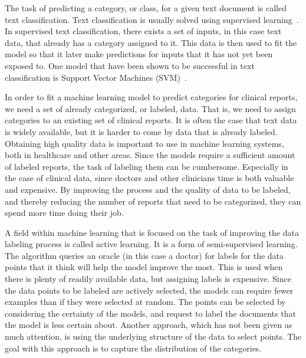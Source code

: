 The task of predicting a category, or class, for a given text document is called text classification.
Text classification is usually solved using supervised learning~\cite{aggarwal2012surveyclass}. 
In supervised text classification, there exists a set of inputs, in this case text data, that already has a category assigned to it.
This data is then used to fit the model so that it later make predictions for inputs that it has not yet been exposed to.
One model that have been shown to be successful in text classification is Support Vector Machines (SVM)~\cite{joachims1998text, aggarwal2012surveyclass, tong2001support}.

In order to fit a machine learning model to predict categories for clinical reports, we need a set of already categorized, or labeled, data.
That is, we need to assign categories to an existing set of clinical reports.
It is often the case that text data is widely available, but it is harder to come by data that is already labeled.
Obtaining high quality data is important to use in machine learning systems, both in healthcare and other areas.
Since the models require a sufficient amount of labeled reports, the task of labeling them can be cumbersome.
Especially in the case of clinical data, since doctors and other clinicians time is both valuable and expensive.
By improving the process and the quality of data to be labeled, and thereby reducing the number of reports that need to be categorized, they can spend more time doing their job.

A field within machine learning that is focused on the task of improving the data labeling process is called active learning.
It is a form of semi-supervised learning.
The algorithm queries an oracle (in this case a doctor) for labels for the data points that it think will help the model improve the most.
This is used when there is plenty of readily available data, but assigning labels is expensive.
Since the data points to be labeled are actively selected, the models can require fewer examples than if they were selected at random.
The points can be selected by considering the certainty of the models, and request to label the documents that the model is less certain about.
Another approach, which has not been given as much attention, is using the underlying structure of the data to select points.
The goal with this approach is to capture the distribution of the categories.

